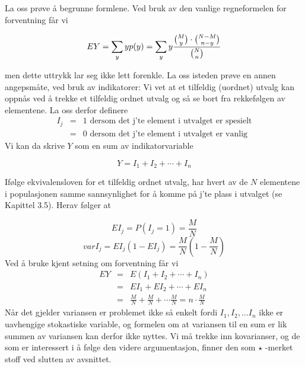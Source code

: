 \begin{center}  \end{center}
\noindent La oss prøve å begrunne formlene. Ved bruk av den vanlige
regneformelen for forventning får vi

\[ EY=\sum_y yp(y)=\sum_y y 
                  \frac{{{M}\choose{y}} \cdot {{N-M}\choose{n-y}}}{{{N}\choose{n}}} \] 

\noindent men dette uttrykk lar seg ikke lett forenkle. La oss isteden
prøve en annen  angepsmåte, ved bruk av indikatorer:
Vi vet at et tilfeldig (uordnet) utvalg kan oppnås ved å trekke
et tilfeldig ordnet utvalg og så se bort fra rekkefølgen av
elementene. La oss derfor definere
\begin{eqnarray*}
     I_j&=&1 \mbox{\ \  dersom det j'te element i utvalget er spesielt} \\
        &=&0 \mbox{\ \ dersom det j'te element i utvalget er vanlig }
\end{eqnarray*}
\noindent Vi kan da skrive $Y$ som en sum av indikatorvariable

\[ Y=I_1+I_2+\cdots +I_n \]

\noindent Ifølge ekvivalensloven for et tilfeldig ordnet utvalg, har hvert
av de $N$ elementene i populasjonen samme sannsynlighet for å
komme på j'te plass i utvalget (se Kapittel 3.5). Herav følger at

\[ EI_j=P(I_j=1)=\frac{M}{N} \]
\[ varI_j=EI_j(1-EI_j)=\frac{M}{N}(1-\frac{M}{N}) \]
\noindent Ved å bruke kjent setning om forventning får vi 
\begin{eqnarray*}
     EY&=&E(I_1+I_2+\cdots +I_n) \\
       &=&EI_1+EI_2+\cdots +EI_n \\
       &=&\frac{M}{N}+\frac{M}{N}+\cdots \frac{M}{N}=n \cdot \frac{M}{N} 
\end{eqnarray*}
\noindent Når det gjelder variansen er problemet ikke så enkelt fordi
 $I_1,I_2, \ldots I_n$ ikke er uavhengige stokastiske variable, og
formelen om at variansen til en sum er lik summen av variansen
kan derfor ikke nyttes. Vi må trekke inn ko\-va\-rianser, og de som
er interessert i å følge den videre argumentasjon, finner den som  
 $\star$ -merket stoff ved slutten av avsnittet. \\

